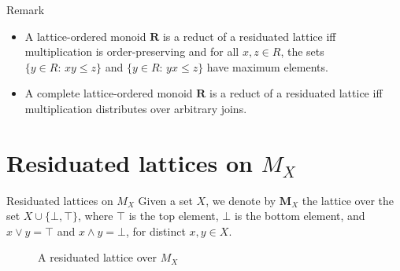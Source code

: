 \documentclass[professionalfont, 10pt]{beamer} %
\theoremstyle{plain}
\theoremstyle{definition}
\begin{document}
\begin{frame}

\begin{block}{Remark}
    \begin{itemize}
        \item A lattice-ordered monoid $\mathbf{R}$ is a reduct of a residuated lattice iff multiplication is order-preserving and for all $x, z \in R$, the sets $\{y \in R: \, xy \leq z\}$ and $\{y \in R: \, yx \leq z\}$ have maximum elements.

        \item A complete lattice-ordered monoid $\mathbf{R}$ is a reduct of a residuated lattice iff multiplication distributes over arbitrary joins.
    \end{itemize}    
\end{block}

\end{frame}

\section{Residuated lattices on $M_X$}

\begin{frame}{Residuated lattices on $M_X$}
Given a set $X$, we denote by $\mathbf{M}_X$ the lattice over the set $X\cup \{\bot, \top\}$, where $\top$ is the top element, $\bot$ is the bottom element, and $x\vee y=\top$ and $x \wedge y=\bot$, for distinct $x,y \in X$.

\begin{figure}[h]
\centering
{}
\caption{A residuated lattice over $M_X$}
\end{figure}
\end{frame}
\end{document}
